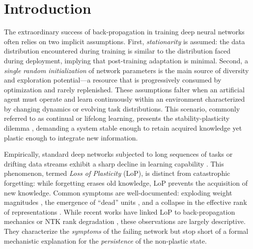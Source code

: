 \documentclass{article}
\numberwithin{figure}{section}
\begin{document}
\section{Introduction}

The extraordinary success of back-propagation in training deep neural networks often relies on two implicit assumptions. First, \emph{stationarity} is assumed: the data distribution encountered during training is similar to the distribution faced during deployment, implying that post-training adaptation is minimal. Second, a \emph{single random initialization} of network parameters is the main source of diversity and exploration potential—a resource that is progressively consumed by optimization and rarely replenished. These assumptions falter when an artificial agent must operate and learn continuously within an environment characterized by changing dynamics or evolving task distributions. This scenario, commonly referred to as continual or lifelong learning, presents the stability-plasticity dilemma \citep{abraham2005memory, chaudhry2018riemannian}, demanding a system stable enough to retain acquired knowledge yet plastic enough to integrate new information.

Empirically, standard deep networks subjected to long sequences of tasks or drifting data streams exhibit a sharp decline in learning capability \citep{dohare2024loss, berariu2021plasticity, nikishin2022primacy}. This phenomenon, termed \emph{Loss of Plasticity} (LoP), is distinct from catastrophic forgetting: while forgetting erases old knowledge, LoP prevents the acquisition of new knowledge. Common symptoms are well-documented: exploding weight magnitudes \citep{nikishin2022primacy}, the emergence of ``dead'' units \citep{sokar2023dormant, lyle2022understanding}, and a collapse in the effective rank of representations \citep{papyan2020prevalence, huh2022lowrank, kumar2020implicit}. While recent works have linked LoP to back-propagation mechanics \citep{dohare2024loss} or NTK rank degradation \citep{lyle2023understanding}, these observations are largely descriptive. They characterize the \emph{symptoms} of the failing network but stop short of a formal mechanistic explanation for the \emph{persistence} of the non-plastic state.
\end{document}
